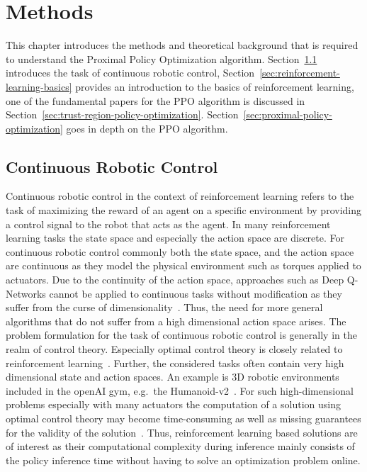 \chapter{Methods}\label{ch:methods}
This chapter introduces the methods and theoretical background that is required to understand the Proximal Policy Optimization algorithm.
Section~\ref{sec:continuous-robotic-control} introduces the task of continuous robotic control, Section~\ref{sec:reinforcement-learning-basics}
provides an introduction to the basics of reinforcement learning, one of the fundamental papers for the PPO algorithm is discussed in Section~\ref{sec:trust-region-policy-optimization}.
Section~\ref{sec:proximal-policy-optimization} goes in depth on the PPO algorithm.


\section{Continuous Robotic Control}\label{sec:continuous-robotic-control}
Continuous robotic control in the context of reinforcement learning refers to the task of maximizing the reward of an agent
on a specific environment by providing a control signal to the robot that acts as the agent.
In many reinforcement learning tasks the state space and especially the action space are discrete.
For continuous robotic control commonly both the state space, and the action space are continuous as they model
the physical environment such as torques applied to actuators.
Due to the continuity of the action space, approaches such as Deep Q-Networks cannot be applied to continuous tasks
without modification as they suffer from the curse of dimensionality~\cite{Lillicrap2019}.
Thus, the need for more general algorithms that do not suffer from a high dimensional action space arises.
The problem formulation for the task of continuous robotic control is generally in the realm of control theory.
Especially optimal control theory is closely related to reinforcement learning~\cite{Gottschalk2019}.
Further, the considered tasks often contain very high dimensional state and action spaces.
An example is 3D robotic environments included in the openAI gym, e.g.\ the Humanoid-v2~\cite{brockman2016openai}.
For such high-dimensional problems especially with many actuators
the computation of a solution using optimal control theory may become time-consuming
as well as missing guarantees for the validity of the solution~\cite{Gottschalk2019}.
Thus, reinforcement learning based  solutions are of interest as their computational complexity
during inference mainly consists of the policy inference time without having to solve an optimization problem online.


